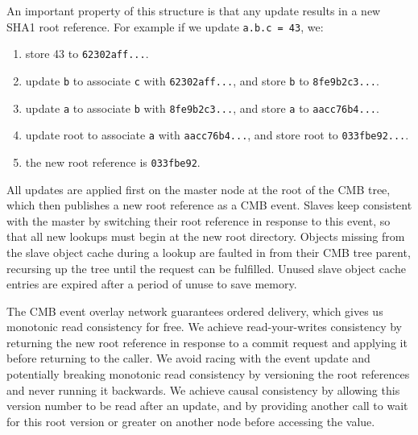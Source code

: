 An important property of this structure is that any update results
in a new SHA1 root reference.  For example if we update {\tt a.b.c = 43}, we:
\begin{enumerate}
\item{store 43 to {\tt 62302aff...}.}
\item{update {\tt b} to associate {\tt c} with {\tt 62302aff...}, and store {\tt b} to {\tt 8fe9b2c3...}.}
\item{update {\tt a} to associate {\tt b} with {\tt 8fe9b2c3...}, and store {\tt a} to {\tt aacc76b4...}.}
\item{update root to associate {\tt a} with {\tt aacc76b4...}, and store root to {\tt 033fbe92...}.}
\item{the new root reference is {\tt 033fbe92}.}
\end{enumerate}

All updates are applied first on the master node at the root of the
CMB tree, which then publishes a new root reference as a CMB event.
Slaves keep consistent with the master by switching their root reference
in response to this event, so that all new lookups must begin at the
new root directory.  Objects missing from the slave object cache during
a lookup are faulted in from their CMB tree parent, recursing up the tree
until the request can be fulfilled.  Unused slave object cache entries are
expired after a period of unuse to save memory.

The CMB event overlay network guarantees ordered delivery, which gives
us monotonic read consistency for free.  We achieve read-your-writes
consistency by returning the new root reference in response to a commit
request and applying it before returning to the caller.  We avoid
racing with the event update and potentially breaking monotonic read
consistency by versioning the root references and never running it
backwards.  We achieve causal consistency by allowing this version number
to be read after an update, and by providing another call to wait for this
root version or greater on another node before accessing the value.

